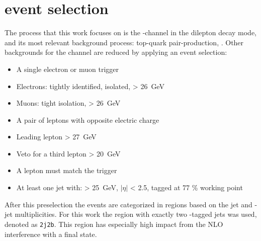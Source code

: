 




\section{\tW event selection}

The process that this work focuses on is the \tW-channel in the dilepton decay mode, and its most relevant background process: top-quark pair-production, \ttbar.
Other backgrounds for the \tW channel are reduced by applying an event selection:


\begin{itemize}
\item A single electron or muon trigger
\item Electrons: tightly identified, isolated, \ET > \SI{26}{\giga \electronvolt}
\item Muons: tight isolation, \pT > \SI{26}{\giga \electronvolt}
\item A pair of leptons with opposite electric charge
\item Leading lepton \pT > \SI{27}{\giga \electronvolt}
\item Veto for a third lepton \pT > \SI{20}{\giga \electronvolt}
\item A lepton must match the trigger
\item At least one jet with: \pT > \SI{25}{\giga \electronvolt}, $|\eta|$ < \num{2.5}, tagged at \num{77} \% working point
\end{itemize}

After this preselection the events are categorized in regions based on the jet and \Pbottom-jet multiplicities. For this work the region with exactly two \Pbottom-tagged jets was used, denoted as \texttt{2j2b}. This region has especially high impact from the NLO interference with a \ttbar final state.

